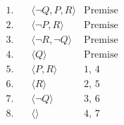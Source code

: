 \documentclass[12pt]{article}
\begin{document}
\begin{align*}
    1. \hspace{1em} & \langle \neg Q, P, R \rangle                & \text{Premise} \\
    2. \hspace{1em} & \langle \neg P, R \rangle                   & \text{Premise} \\
    3. \hspace{1em} & \langle \neg R, \neg Q \rangle              & \text{Premise} \\
    4. \hspace{1em} & \langle Q \rangle                           & \text{Premise} \\
    5. \hspace{1em} & \langle P, R \rangle                        & \text{1, 4} \\
    6. \hspace{1em} & \langle R \rangle                           & \text{2, 5} \\
    7. \hspace{1em} & \langle \neg Q \rangle                      & \text{3, 6} \\  
    8. \hspace{1em} & \langle \rangle                             & \text{4, 7} \\  
\end{align*}
\end{document}
